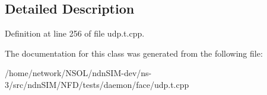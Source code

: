 \subsection{Detailed Description}


Definition at line 256 of file udp.\+t.\+cpp.



The documentation for this class was generated from the following file\+:\begin{DoxyCompactItemize}
\item 
/home/network/\+N\+S\+O\+L/ndn\+S\+I\+M-\/dev/ns-\/3/src/ndn\+S\+I\+M/\+N\+F\+D/tests/daemon/face/udp.\+t.\+cpp\end{DoxyCompactItemize}
